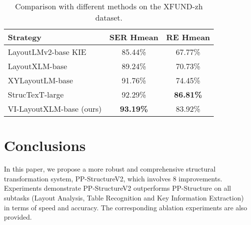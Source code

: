 \documentclass[letterpaper]{article} \usepackage{aaai21}  \usepackage{times}  \usepackage{helvet} \usepackage{courier}  \usepackage[hyphens]{url}  \usepackage{graphicx} \usepackage{algorithm}
\begin{document}
\begin{table}[H]
\begin{center}
\begin{tabular}{l|c|c}
\hline
Strategy & SER Hmean & RE Hmean \\
\hline
LayoutLMv2-base KIE & 85.44\% & 67.77\% \\
LayoutXLM-base  & 89.24\% & 70.73\% \\
XYLayoutLM-base & 91.76\% & 74.45\% \\
StrucTexT-large & 92.29\% & \textbf{86.81\%} \\
VI-LayoutXLM-base (ours) & \textbf{93.19\%} & 83.92\% \\
\hline
\end{tabular}
\end{center}
\caption{Comparison with different methods on the XFUND-zh dataset.}
\label{ablation_kie_xfund_sota}
\end{table}

\section{Conclusions}

In this paper, we propose a more robust and comprehensive structural transformation system, PP-StructureV2, which involves 8 improvements. Experiments demonstrate PP-StructureV2 outperforms PP-Structure on all subtasks (Layout Analysis, Table Recognition and Key Information Extraction) in terms of speed and accuracy. The corresponding ablation experiments are also provided.


\end{document}
